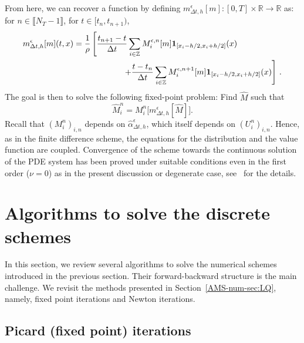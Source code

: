 \documentclass{amsproc}
\theoremstyle{definition}
\theoremstyle{remark}
\numberwithin{equation}{section}
\newcommand{\RR}{{\mathbb R}}
\newcommand{\ZZ}{{\mathbb Z}}
\newcommand{\ctrl}{\alpha}
\newcommand{\indic}{\mathbf{1}}
\begin{document}
From here, we can recover a function by defining $m^{\epsilon}_{\Delta t, h}[m]: [0,T] \times \RR \to \RR$ as: for $n \in \llbracket N_T-1 \rrbracket$, for $t \in [t_n, t_{n+1})$,
\begin{align}
	\label{AMS-num-eq:m-epsilon-Deltat-h}
	m^{\epsilon}_{\Delta t, h}[m](t,x) 
	&= \frac{1}{\rho} \left[ \frac{t_{n+1}-t}{\Delta t} \sum_{i \in \ZZ} M^{\epsilon, n}_{i}[m] \indic_{[x_i - h/2, x_i+h/2]}(x)  \right.
	\\
	&\qquad\qquad\qquad 
	\left. + \frac{t-t_{n}}{\Delta t} \sum_{i \in \ZZ} M^{\epsilon,n+1}_{i}[m] \indic_{[x_i - h/2, x_i+h/2]}(x) \right] \, .
	\notag
\end{align}
The goal is then to solve the following fixed-point problem: Find $\hat M$ such that
$$
	\hat M^{n}_i = M^n_i\big[m^{\epsilon}_{\Delta t, h}[\hat M]\big].
$$
Recall that $(M^n_i)_{i,n}$ depends on $\hat \ctrl^{\epsilon}_{\Delta t, h}$, which itself depends on $(U^n_i)_{i,n}$. Hence, as in the finite difference scheme, the equations for the distribution and the value function are coupled.   
Convergence of the scheme towards the continuous solution of the PDE system has been proved under suitable conditions even in the first order ($\nu=0$) as in the present discussion or degenerate case, see~\cite{MR3148086,MR3392626,MR3828859} for the details.








\clearpage

\section{\bf Algorithms to solve the discrete schemes}
\label{AMS-num-sec:sol-strat}

In this section, we review several algorithms to solve the numerical schemes introduced in the previous section. Their forward-backward structure is the main challenge. We revisit the methods presented in Section~\ref{AMS-num-sec:LQ}, namely, fixed point iterations and Newton iterations.



\subsection{Picard (fixed point) iterations}
\end{document}
